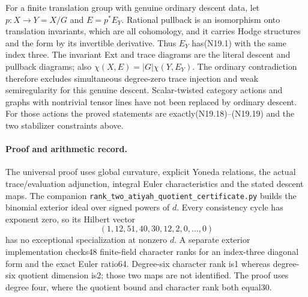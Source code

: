For a finite translation group with genuine ordinary descent data,
let $p:X\to Y=X/G$ and $E=p^*E_Y$. Rational pullback is an
isomorphism onto translation invariants, which are all cohomology,
and it carries Hodge structures and the form by its invertible
derivative. Thus $E_Y$ has(N19.1) with the same index three.
The invariant Ext and trace diagrams are the literal descent and
pullback diagrams; also $\chi(X,E)=|G|\chi(Y,E_Y)$. The ordinary
contradiction therefore excludes simultaneous degree-zero trace
injection and weak semiregularity for this genuine descent.
Scalar-twisted category actions and graphs with nontrivial tensor
lines have not been replaced by ordinary descent. For those actions
the proved statements are exactly(N19.18)--(N19.19) and the two
stabilizer constraints above.

\paragraph{Proof and arithmetic record.}
The universal proof uses global curvature, explicit Yoneda relations,
the actual trace/evaluation adjunction, integral Euler characteristics
and the stated descent maps. The companion
\texttt{rank\_two\_atiyah\_quotient\_certificate.py} builds the binomial
exterior ideal over signed powers of $d$. Every consistency cycle has
exponent zero, so its Hilbert vector
\[
                     (1,12,51,40,30,12,2,0,\ldots,0)
\]
has no exceptional specialization at nonzero $d$.
A separate exterior implementation checks48 finite-field character
ranks for an index-three diagonal form and the exact Euler ratio64.
Degree-six character rank is1 whereas degree-six quotient dimension
is2; those two maps are not identified. The proof uses degree four,
where the quotient bound and character rank both equal30.

